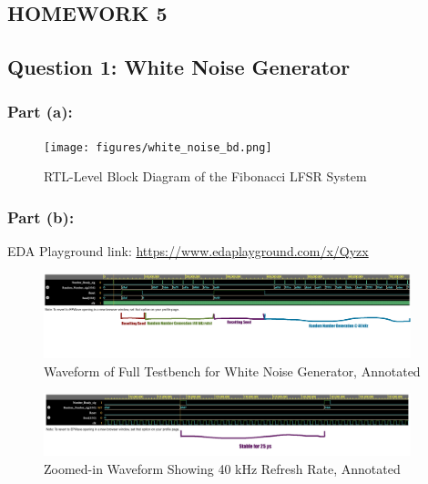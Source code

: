 \documentclass[10pt]{article}
\begin{document}

\begin{centering}
  \section*{HOMEWORK 5}
\end{centering}

\subsection*{Question 1: White Noise Generator}

\subsubsection*{Part (a):}

\begin{figure} [H]
  \center
  \texttt{[image: figures/white\_noise\_bd.png]}
  \caption{RTL-Level Block Diagram of the Fibonacci LFSR System}
\end{figure}

\subsubsection*{Part (b):}

EDA Playground link: \url{https://www.edaplayground.com/x/Qyzx}

\begin{figure} [H]
  \center
  \includegraphics[width=0.95\textwidth]{figures/white_noise_gen_tb.png}
  \caption{Waveform of Full Testbench for White Noise Generator, Annotated}
\end{figure}

\begin{figure} [H]
  \center
  \includegraphics[width=0.95\textwidth]{figures/zoomed_in_wng.png}
  \caption{Zoomed-in Waveform Showing 40 kHz Refresh Rate, Annotated}
\end{figure}
\end{document}
